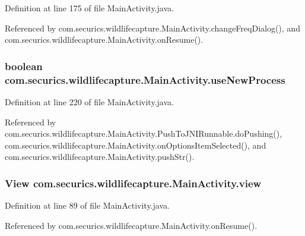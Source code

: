 Definition at line 175 of file Main\+Activity.\+java.



Referenced by com.\+securics.\+wildlifecapture.\+Main\+Activity.\+change\+Freq\+Dialog(), and com.\+securics.\+wildlifecapture.\+Main\+Activity.\+on\+Resume().

\subsubsection[{use\+New\+Process}]{\setlength{\rightskip}{0pt plus 5cm}boolean com.\+securics.\+wildlifecapture.\+Main\+Activity.\+use\+New\+Process\hspace{0.3cm}{\ttfamily [private]}}\label{classcom_1_1securics_1_1wildlifecapture_1_1_main_activity_ab7b5aac3107a74f406f666f79bd6ab7c}


Definition at line 220 of file Main\+Activity.\+java.



Referenced by com.\+securics.\+wildlifecapture.\+Main\+Activity.\+Push\+To\+J\+N\+I\+Runnable.\+do\+Pushing(), com.\+securics.\+wildlifecapture.\+Main\+Activity.\+on\+Options\+Item\+Selected(), and com.\+securics.\+wildlifecapture.\+Main\+Activity.\+push\+Str().

\subsubsection[{view}]{\setlength{\rightskip}{0pt plus 5cm}View com.\+securics.\+wildlifecapture.\+Main\+Activity.\+view\hspace{0.3cm}{\ttfamily [private]}}\label{classcom_1_1securics_1_1wildlifecapture_1_1_main_activity_ab4d577ba8de8b58d8b2fbd17871e01ce}


Definition at line 89 of file Main\+Activity.\+java.



Referenced by com.\+securics.\+wildlifecapture.\+Main\+Activity.\+on\+Resume().

